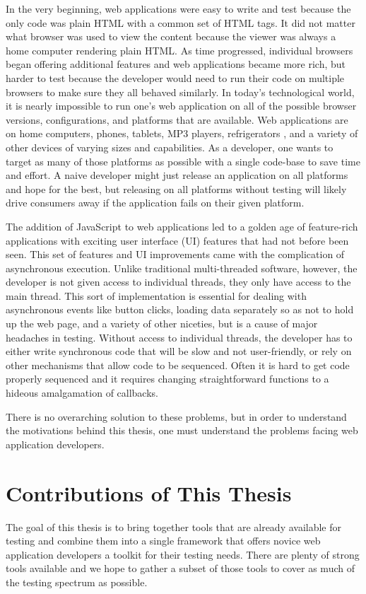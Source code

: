 \documentclass[12pt]{ucthesis}
\begin{document}
In the very beginning, web applications were easy to write and test because the only code was plain HTML with a common set of HTML tags. It did not matter what browser was used to view the content because the viewer was always a home computer rendering plain HTML. As time progressed, individual browsers began offering additional features and web applications became more rich, but harder to test because the developer would need to run their code on multiple browsers to make sure they all behaved similarly. In today's technological world, it is nearly impossible to run one's web application on all of the possible browser versions, configurations, and platforms that are available. Web applications are on home computers, phones, tablets, MP3 players, refrigerators \cite{SamsungFridge}, and a variety of other devices of varying sizes and capabilities. As a developer, one wants to target as many of those platforms as possible with a single code-base to save time and effort. A naive developer might just release an application on all platforms and hope for the best, but releasing on all platforms without testing will likely drive consumers away if the application fails on their given platform.

The addition of JavaScript to web applications led to a golden age of feature-rich applications with exciting user interface (UI) features that had not before been seen. This set of features and UI improvements came with the complication of asynchronous execution. Unlike traditional multi-threaded software, however, the developer is not given access to individual threads, they only have access to the main thread. This sort of implementation is essential for dealing with asynchronous events like button clicks, loading data separately so as not to hold up the web page, and a variety of other niceties, but is a cause of major headaches in testing. Without access to individual threads, the developer has to either write synchronous code that will be slow and not user-friendly, or rely on other mechanisms that allow code to be sequenced. Often it is hard to get code properly sequenced and it requires changing straightforward functions to a hideous amalgamation of callbacks.

There is no overarching solution to these problems, but in order to understand the motivations behind this thesis, one must understand the problems facing web application developers.

\section{Contributions of This Thesis}
The goal of this thesis is to bring together tools that are already available for testing and combine them into a single framework that offers novice web application developers a toolkit for their testing needs. There are plenty of strong tools available and we hope to gather a subset of those tools to cover as much of the testing spectrum as possible. 
\end{document}
